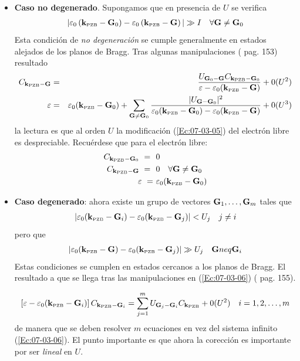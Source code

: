 \begin{itemize}
    \item \textbf{Caso no degenerado}. Supongamos que en presencia de $U$ se verifica 
    \begin{eqnarray}
    |\varepsilon_0 \left( \mathbf{k}_{\text{{\tiny PZB}}}-\mathbf{G}_0 \right) - \varepsilon_0 \left( \mathbf{k}_{\text{{\tiny PZB}}}-\mathbf{G} \right) | \gg I \quad \forall \mathbf{G} \neq \mathbf{G}_0
    \end{eqnarray}
    Esta condición de \textit{no degeneración} se cumple generalmente en estados alejados de los planos de Bragg. Tras algunas manipulaciones (\cite{Mermin_Solid_State} pag. 153) resultado
    \begin{eqnarray*}
    C_{\mathbf{k}_{\text{{\tiny PZB}}} - \mathbf{G}} & = & \frac{U_{\mathbf{G}_0-\mathbf{G}} C_{\mathbf{k}_{\text{{\tiny PZB}}} - \mathbf{G}_0} }{\varepsilon - \varepsilon_0(\mathbf{k}_{\text{{\tiny PZB}}}-\mathbf{G})} + 0 (U^2) \\
    \varepsilon & = & \varepsilon_0 (\mathbf{k}_{\text{{\tiny PZB}}}-\mathbf{G}_0) + \sum_{\mathbf{G}\neq\mathbf{G}_0} \frac{|U_{\mathbf{G}-\mathbf{G}_0}|^2}{\varepsilon_0 (\mathbf{k}_{\text{{\tiny PZB}}}- \mathbf{G}_0)-\varepsilon_0 (\mathbf{k}_{\text{{\tiny PZB}}}-\mathbf{G})}+0(U^3)
    \end{eqnarray*}
    la lectura es que al orden $U$ la modificación (\ref{Ec:07-03-05}) del electrón libre es despreciable. Recuérdese que para el electrón libre:
    \begin{equation}
    \begin{split}
        C_{\mathbf{k}_{\text{{\tiny PZB}}}-\mathbf{G}_0} \ = \ & \ 0 \\
        C_{\mathbf{k}_{\text{{\tiny PZB}}}-\mathbf{G}} \ = \ & \ 0 \quad \forall \mathbf{G} \neq \mathbf{G}_0 \\
        \varepsilon \ = & \ \varepsilon_0 (\mathbf{k}_{\text{{\tiny PZB}}}-\mathbf{G}_0)
    \end{split}
    \end{equation}
    \item \textbf{Caso degenerado}: ahora existe un grupo de vectores $\mathbf{G}_1,\ldots,\mathbf{G}_m$ tales que 
    \begin{eqnarray}
    |\varepsilon_0 (\mathbf{k}_{\text{{\tiny PZB}}} - \mathbf{G}_i ) - \varepsilon_0 (\mathbf{k}_{\text{{\tiny PZB}}}- \mathbf{G}_j)|<U_j \quad j\neq i \label{Ec:07-04-03}
    \end{eqnarray}
    pero que
    \begin{eqnarray}
    |\varepsilon_0 (\mathbf{k}_{\text{{\tiny PZB}}} - \mathbf{G}) - \varepsilon_0 (\mathbf{k}_{\text{{\tiny PZB}}}- \mathbf{G}_j)|\gg U_j \quad  \mathbf{G} neq \mathbf{G}_i \label{Ec:07-04-04}
    \end{eqnarray} 
    Estas condiciones se cumplen en estados cercanos a los planos de Bragg. El resultado a que se llega tras las manipulaciones en (\ref{Ec:07-03-06}) (\cite{Mermin_Solid_State} pag. 155). 

    \begin{eqnarray}
    \left[ \varepsilon-\varepsilon_0(\mathbf{k}_{\text{{\tiny PZB}}} - \mathbf{G}_i) \right] C_{\mathbf{k}_{\text{{\tiny PZB}}} - \mathbf{G}_i} = \sum_{j=1}^{m} U_{\mathbf{G}_j-\mathbf{G}_i} C_{\mathbf{k}_{\text{{\tiny PZB}}}} + 0(U^2) \quad i=1,2,\ldots,m \label{Ec:07-04-05}
    \end{eqnarray}
    de manera que se deben resolver $m$ ecuaciones en vez del sistema infinito (\ref{Ec:07-03-06}). El punto importante es que ahora la corección es importante por ser \textit{lineal} en $U$.
\end{itemize}

